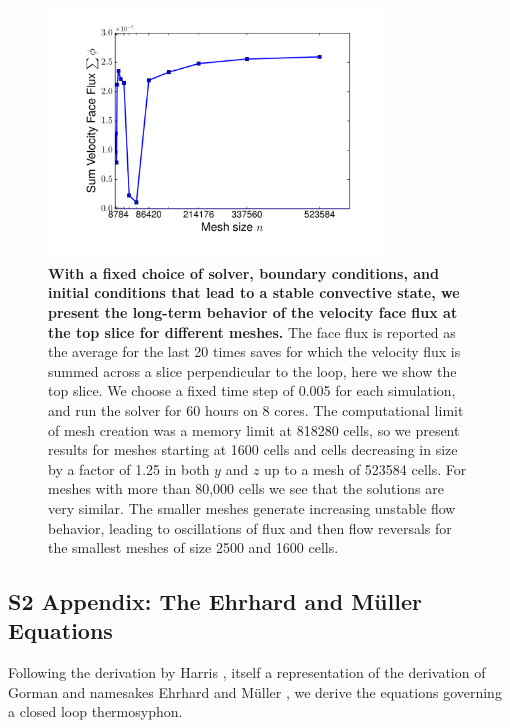 \documentclass[10pt,letterpaper]{article}
\begin{document}
\begin{figure}[h!]
  \centering
    \includegraphics[width=0.79\textwidth]{fig12_Flux-end-20-times.pdf}
  \caption[Long-term behavior for different meshes]{
  \textbf{With a fixed choice of solver, boundary conditions, and initial conditions that lead to a stable convective state, we present the long-term behavior of the velocity face flux at the top slice for different meshes.}
    The face flux is reported as the average for the last 20 times saves for which the velocity flux is summed across a slice perpendicular to the loop, here we show the top slice.
    We choose a fixed time step of 0.005 for each simulation, and run the solver for 60 hours on 8 cores.
    The computational limit of mesh creation was a memory limit at 818280 cells, so we present results for meshes starting at 1600 cells and cells decreasing in size by a factor of 1.25 in both $y$ and $z$ up to a mesh of 523584 cells.
    For meshes with more than 80,000 cells we see that the solutions are very similar.
    The smaller meshes generate increasing unstable flow behavior, leading to oscillations of flux and then flow reversals for the smallest meshes of size 2500 and 1600 cells.
  }
  \label{fig:meshverification}
\end{figure}

\clearpage
\pagebreak
\subsection*{S2 Appendix: The Ehrhard and M\"{u}ller Equations}
\label{S2}

Following the derivation by Harris \cite{harris2011predicting}, itself a representation of the derivation of Gorman \cite{gorman1986} and namesakes Ehrhard and M\"{u}ller \cite{ehrhard1990dynamical}, we derive the equations governing a closed loop thermosyphon.
\end{document}

